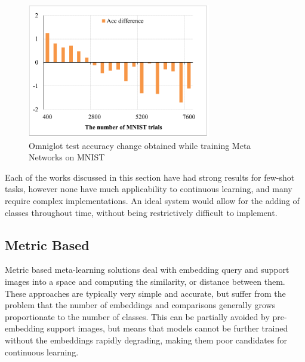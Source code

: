 \documentclass{report}
\begin{document}
	\begin{figure}[h]
		\centering
		\includegraphics[width=8cm]{metanet2}
		\caption{Omniglot test accuracy change obtained while training Meta Networks on MNIST}
		\label{fig:metanet:2}
	\end{figure}
	Each of the works discussed in this section have had strong results for few-shot tasks, however none have much applicability to continuous learning, and many require complex implementations. An ideal system would allow for the adding of classes throughout time, without being restrictively difficult to implement. \par
	
	\subsection{Metric Based} \label{related-meta-metr:1}
	Metric based meta-learning solutions deal with embedding query and support images into a space and computing the similarity, or distance between them. These approaches are typically very simple and accurate, but suffer from the problem that the number of embeddings and comparisons generally grows proportionate to the number of classes. This can be partially avoided by pre-embedding support images, but means that models cannot be further trained without the embeddings rapidly degrading, making them poor candidates for continuous learning. \par
	
\end{document}

